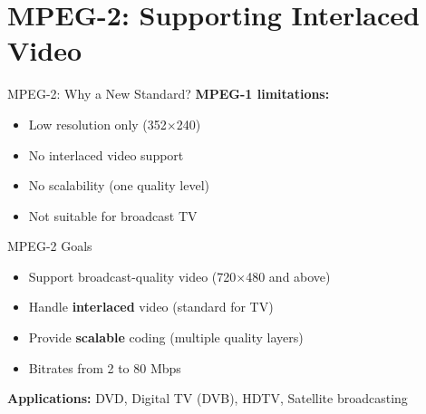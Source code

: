 \documentclass[aspectratio=169,12pt]{beamer}
\begin{document}
\section{MPEG-2: Supporting Interlaced Video}

\begin{frame}{MPEG-2: Why a New Standard?}
    \textbf{MPEG-1 limitations:}
    \begin{itemize}
        \item Low resolution only (352$\times$240)
        \item No interlaced video support
        \item No scalability (one quality level)
        \item Not suitable for broadcast TV
    \end{itemize}
    
    \vspace{0.3cm}
    \begin{block}{MPEG-2 Goals}
        \begin{itemize}
            \item Support broadcast-quality video (720$\times$480 and above)
            \item Handle \textbf{interlaced} video (standard for TV)
            \item Provide \textbf{scalable} coding (multiple quality layers)
            \item Bitrates from 2 to 80 Mbps
        \end{itemize}
    \end{block}
    
    \vspace{0.2cm}
    \textbf{Applications:} DVD, Digital TV (DVB), HDTV, Satellite broadcasting
\end{frame}
\end{document}
